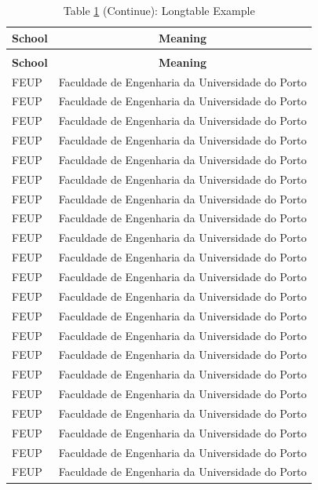 	\begin{longtable}{lc}
	\caption{Longtable Example}\label{tab:longtableexample}\\
	\toprule
	\textbf{School} & \textbf{Meaning} \\
	\midrule
	\endfirsthead
	\caption*{Table \ref{tab:longtableexample} (Continue): Longtable Example}\\
	\toprule
	\textbf{School} & \textbf{Meaning} \\
	\midrule
	\endhead
		FEUP	&  Faculdade de Engenharia da Universidade do Porto\\
		FEUP	&  Faculdade de Engenharia da Universidade do Porto\\
		FEUP	&  Faculdade de Engenharia da Universidade do Porto\\
		FEUP	&  Faculdade de Engenharia da Universidade do Porto\\
		FEUP	&  Faculdade de Engenharia da Universidade do Porto\\
		FEUP	&  Faculdade de Engenharia da Universidade do Porto\\
		FEUP	&  Faculdade de Engenharia da Universidade do Porto\\
		FEUP	&  Faculdade de Engenharia da Universidade do Porto\\
		FEUP	&  Faculdade de Engenharia da Universidade do Porto\\
		FEUP	&  Faculdade de Engenharia da Universidade do Porto\\
		FEUP	&  Faculdade de Engenharia da Universidade do Porto\\
		FEUP	&  Faculdade de Engenharia da Universidade do Porto\\
		FEUP	&  Faculdade de Engenharia da Universidade do Porto\\
		FEUP	&  Faculdade de Engenharia da Universidade do Porto\\
				FEUP	&  Faculdade de Engenharia da Universidade do Porto\\
		FEUP	&  Faculdade de Engenharia da Universidade do Porto\\
		FEUP	&  Faculdade de Engenharia da Universidade do Porto\\
		FEUP	&  Faculdade de Engenharia da Universidade do Porto\\
		FEUP	&  Faculdade de Engenharia da Universidade do Porto\\
		FEUP	&  Faculdade de Engenharia da Universidade do Porto\\
		FEUP	&  Faculdade de Engenharia da Universidade do Porto\\

\end{longtable}
